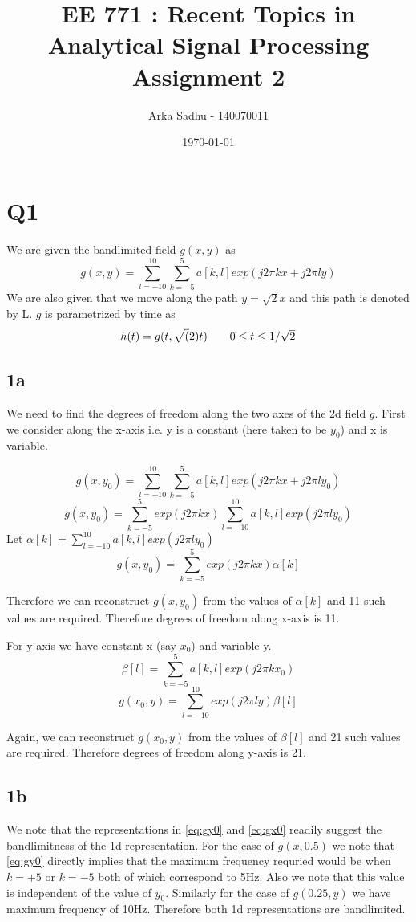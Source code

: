 \documentclass{article}
\title{EE 771 : Recent Topics in Analytical Signal Processing Assignment 2}
\author{Arka Sadhu - 140070011}
\date{\today}
\begin{document}
\maketitle

\section*{Q1}
We are given the bandlimited field $g(x, y)$ as
$$g(x,y) = \sum_{l=-10}^{10}\sum_{k=-5}^{5} a[k, l] exp(j2\pi kx + j2\pi ly)$$
We are also given that we move along the path $y = \sqrt{2}x$ and this path is denoted by L. $g$ is parametrized by time as
\begin{align}
  \label{eq:1}
  h(t) = g(t, \sqrt(2)t) \tag*{$0 \le t \le 1/\sqrt{2}$}
\end{align}

\subsection*{1a}
We need to find the degrees of freedom along the two axes of the 2d field $g$. First we consider along the x-axis i.e. y is a constant (here taken to be $y_0$) and x is variable.

$$g(x, y_0) = \sum_{l=-10}^{10} \sum_{k=-5}^5a[k, l] exp(j2 \pi kx + j2\pi ly_0)$$
$$g(x, y_0) = \sum_{k=-5}^{5} exp(j2 \pi kx) \sum_{l=-10}^{10} a[k, l] exp(j2\pi ly_0)$$
Let $\alpha [k] = \sum_{l=-10}^{10}a[k, l] exp(j2\pi ly_0)$
\begin{equation}
  \label{eq:gy0}
  g(x, y_0) = \sum_{k=-5}^{5} exp(j2 \pi kx) \alpha[k]
\end{equation}

Therefore we can reconstruct $g(x, y_0)$ from the values of $\alpha[k]$ and 11 such values are required. Therefore degrees of freedom along x-axis is 11.

For y-axis we have constant x (say $x_0$) and variable y.
$$\beta[l] = \sum_{k=-5}^5 a[k,l] exp(j2\pi kx_0)$$
\begin{equation}
  \label{eq:gx0}
  g(x_0, y) = \sum_{l=-10}^{10}exp(j2 \pi ly) \beta[l]
\end{equation}

Again, we can reconstruct $g(x_0, y)$ from the values of $\beta[l]$ and 21 such values are required. Therefore degrees of freedom along y-axis is 21.

\subsection*{1b}
We note that the representations in \ref{eq:gy0} and \ref{eq:gx0} readily suggest the bandlimitness of the 1d representation. For the case of $g(x, 0.5)$ we note that \ref{eq:gy0} directly implies that the maximum frequency requried would be when $k = +5$ or $k = -5$ both of which correspond to 5Hz. Also we note that this value is independent of the value of $y_0$. Similarly for the case of $g(0.25, y)$ we have maximum frequency of 10Hz. Therefore both 1d representations are bandlimited.
\end{document}
